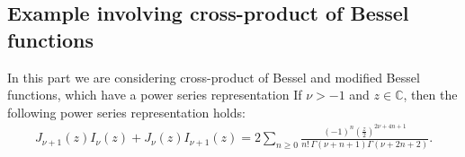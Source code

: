 \documentclass[a4paper,11pt,reqno]{amsart}
\begin{document}
\subsection{Example involving  cross-product of Bessel functions}\label{sec:Appl-CP-Bessel}

In this part we are considering  cross-product of Bessel and modified Bessel functions, which have a power series \cite{Al-Kharsani-Bessel-prod}  representation  
If $\nu > -1$ and $z \in \mathbb{C}$, then the following power series representation holds:
\begin{align}\label{eqn:corssproduct-Bessel}
  J_{\nu+1}(z) I_\nu(z) + J_\nu(z) I_{\nu+1}(z) = 2 \sum_{n \geq 0} \frac{(-1)^n \left( \frac{z}{2} \right)^{2\nu + 4n + 1}}{n! \, \Gamma(\nu + n + 1)\Gamma(\nu + 2n + 2)}.  
\end{align}
\end{document}
